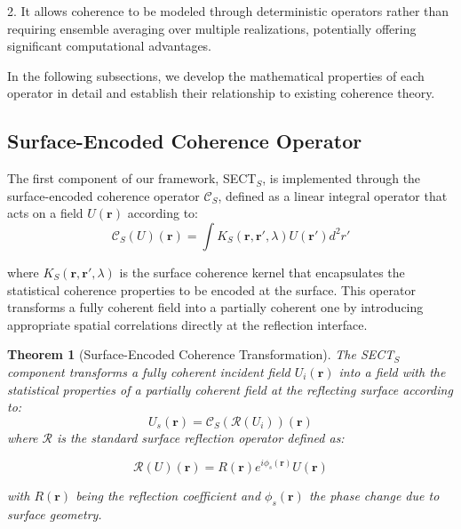 \documentclass[a4paper,12pt]{article}
\newtheorem{theorem}{Theorem}[section]
\begin{document}
2. It allows coherence to be modeled through deterministic operators rather than requiring ensemble averaging over multiple realizations, potentially offering significant computational advantages.

In the following subsections, we develop the mathematical properties of each operator in detail and establish their relationship to existing coherence theory.

\subsection{Surface-Encoded Coherence Operator}

The first component of our framework, SECT$_S$, is implemented through the surface-encoded coherence 
operator $\mathcal{C}_S$, defined as a linear integral operator that acts on a field $U(\bm{r})$ according to:
\begin{equation}
\mathcal{C}_S(U)(\bm{r}) = \int K_S(\bm{r}, \bm{r}', \lambda) U(\bm{r}') d^2r'
\end{equation}

where $K_S(\bm{r}, \bm{r}', \lambda)$ is the surface coherence kernel that encapsulates the statistical coherence properties to be encoded at the surface. This operator transforms a fully coherent field into a partially coherent one by introducing appropriate spatial correlations directly at the reflection interface.

\begin{theorem}[Surface-Encoded Coherence Transformation]
The SECT$_S$ component transforms a fully coherent incident field $U_i(\bm{r})$ into a field with the statistical properties of a partially coherent field at the reflecting surface according to:
\begin{equation}
U_s(\bm{r}) = \mathcal{C}_S(\mathcal{R}(U_i))(\bm{r})
\end{equation}
where $\mathcal{R}$ is the standard surface reflection operator defined as:

\begin{equation}
\mathcal{R}(U)(\bm{r}) = R(\bm{r})e^{i\phi_s(\bm{r})}U(\bm{r}) 
\end{equation}

with $R(\bm{r})$ being the reflection coefficient and $\phi_s(\bm{r})$ the phase change due to surface geometry.
\end{theorem}
\end{document}
